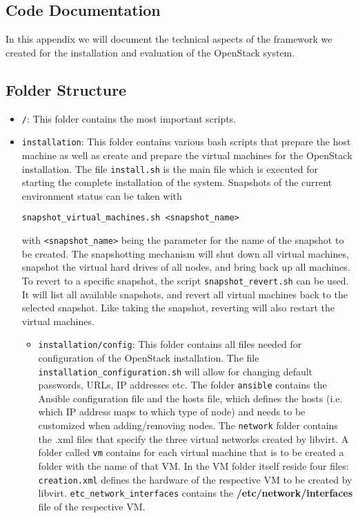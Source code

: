 \begin{appendix}
\section{Code Documentation}
\label{appendix}
In this appendix we will document the technical aspects of the framework we created for the installation and evaluation of the OpenStack system.



\subsection{Folder Structure}
\begin{itemize}
	\item \verb|/|: This folder contains the most important scripts.  
	\item \verb|installation|: This folder contains various bash scripts that prepare the host machine as well as create and prepare the virtual machines for the OpenStack installation. The file \verb|install.sh| is the main file which is executed for starting the complete installation of the system. Snapshots of the current environment status can be taken with
\begin{verbatim}
snapshot_virtual_machines.sh <snapshot_name> 
\end{verbatim}
with \verb|<snapshot_name>| being the parameter for the name of the snapshot to be created. The snapshotting mechanism will shut down all virtual machines, snapshot the virtual hard drives of all nodes, and bring back up all machines. To revert to a specific snapshot, the script \verb|snapshot_revert.sh| can be used. It will list all available snapshots, and revert all virtual machines back to the selected snapshot. Like taking the snapshot, reverting will also restart the virtual machines.
	
	\begin{itemize}
		\item \verb|installation/config|: This folder contains all files needed for configuration of the OpenStack installation. The file \verb|installation_configuration.sh| will allow for changing default passwords, URLs, IP addresses etc. The folder
\verb|ansible| contains the Ansible configuration file and the hosts file, which defines the hosts (i.e. which IP address maps to which type of node) and needs to be customized when adding/removing nodes. The \verb|network| folder contains the .xml files that specify the three virtual networks created by libvirt. A folder called \verb|vm| contains for each virtual machine that is to be created a folder with the name of that VM. In the VM folder itself reside four files: \verb|creation.xml| defines the hardware of the respective VM to be created by libvirt. \verb|etc_network_interfaces| contains the \textbf{/etc/network/interfaces} file of the respective VM.
	\end{itemize}
	

\end{itemize}
\end{appendix}
